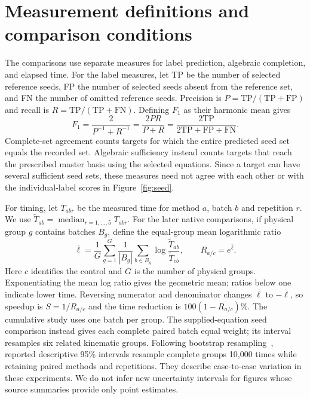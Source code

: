 \section{Measurement definitions and comparison conditions}
\label{app:timing}
The comparisons use separate measures for label prediction, algebraic completion, and elapsed time. For the label measures, let TP be the number of selected reference seeds, FP the number of selected seeds absent from the reference set, and FN the number of omitted reference seeds. Precision is $P=\mathrm{TP}/(\mathrm{TP}+\mathrm{FP})$ and recall is $R=\mathrm{TP}/(\mathrm{TP}+\mathrm{FN})$. Defining $F_1$ as their harmonic mean gives
\begin{equation}
 F_1=\frac{2}{P^{-1}+R^{-1}}=\frac{2PR}{P+R}
     =\frac{2\mathrm{TP}}{2\mathrm{TP}+\mathrm{FP}+\mathrm{FN}}.
\end{equation}
Complete-set agreement counts targets for which the entire predicted seed set equals the recorded set. Algebraic sufficiency instead counts targets that reach the prescribed master basis using the selected equations. Since a target can have several sufficient seed sets, these measures need not agree with each other or with the individual-label scores in Figure~\ref{fig:seed}.

For timing, let $T_{abr}$ be the measured time for method $a$, batch $b$ and repetition $r$. We use $\widetilde T_{ab}=\operatorname{median}_{r=1,\ldots,5}T_{abr}$. For the later native comparisons, if physical group $g$ contains batches $B_g$, define the equal-group mean logarithmic ratio
\begin{equation}
 \overline\ell=\frac1G\sum_{g=1}^G\frac1{|B_g|}
 \sum_{b\in B_g}\log\frac{\widetilde T_{ab}}{\widetilde T_{cb}},
 \qquad R_{a/c}=e^{\overline\ell}.
 \label{eq:ratio}
\end{equation}
Here $c$ identifies the control and $G$ is the number of physical groups. Exponentiating the mean log ratio gives the geometric mean; ratios below one indicate lower time. Reversing numerator and denominator changes $\overline\ell$ to $-\overline\ell$, so speedup is $S=1/R_{a/c}$ and the time reduction is $100(1-R_{a/c})\%$. The cumulative study uses one batch per group. The supplied-equation seed comparison instead gives each complete paired batch equal weight; its interval resamples six related kinematic groups. Following bootstrap resampling~\cite{Efron1979}, reported descriptive 95\% intervals resample complete groups 10,000 times while retaining paired methods and repetitions. They describe case-to-case variation in these experiments. We do not infer new uncertainty intervals for figures whose source summaries provide only point estimates.

